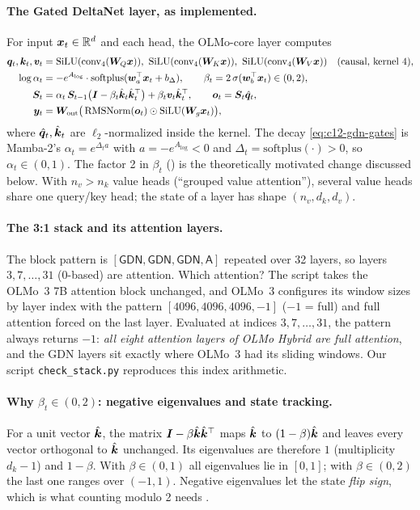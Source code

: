 \paragraph{The Gated DeltaNet layer, as implemented.} For input $\bm{x}_t\in\mathbb{R}^d$ and each head, the
OLMo-core layer computes
\begin{align}
  \vq_t,\vk_t,\vv_t &= \SiLU(\mathrm{conv}_4(\mW_Q\vx)),\ \SiLU(\mathrm{conv}_4(\mW_K\vx)),\
     \SiLU(\mathrm{conv}_4(\mW_V\vx)) \quad\text{(causal, kernel 4)},\label{eq:c12-gdn-qkv}\\
  \log\alpha_t &= -e^{A_{\log}}\cdot\mathrm{softplus}(\vw_a\T\vx_t + b_{\Delta}),\qquad
  \beta_t = 2\,\sigmoid(\vw_b\T\vx_t)\in(0,2),\label{eq:c12-gdn-gates}\\
  \mS_t &= \alpha_t\,\mS_{t-1}\big(\mI - \beta_t\hat\vk_t\hat\vk_t\T\big) + \beta_t\vv_t\hat\vk_t\T,
     \qquad \vo_t = \mS_t\hat\vq_t,\label{eq:c12-gdn}\\
  \vy_t &= \mW_{\mathrm{out}}\big(\RMSNorm(\vo_t)\had\SiLU(\mW_g\vx_t)\big),\label{eq:c12-gdn-out}
\end{align}
where $\hat{\bm{q}}_t,\hat{\bm{k}}_t$ are $\ell_2$-normalized inside the kernel. The decay
\eqref{eq:c12-gdn-gates} is Mamba-2's $\alpha_t = e^{\Delta_ta}$ with $a = -e^{A_{\log}}<0$ and
$\Delta_t = \mathrm{softplus}(\cdot)>0$, so $\alpha_t\in(0,1)$. The factor 2 in $\beta_t$
(\code{allow_neg_eigval=True}) is the theoretically motivated change discussed below. With
$n_v>n_k$ value heads (``grouped value attention''), several value heads share one query/key
head; the state of a layer has shape $(n_v, d_k, d_v)$.

\paragraph{The 3:1 stack and its attention layers.} The block pattern is
$[\mathsf{GDN},\mathsf{GDN},\mathsf{GDN},\mathsf{A}]$ repeated over 32 layers, so layers
$3,7,\dots,31$ (0-based) are attention. Which attention? The script takes the OLMo~3 7B attention
block unchanged, and OLMo~3 configures its window sizes by layer index with the pattern
$[4096,4096,4096,-1]$ ($-1$ = full) and full attention forced on the last layer. Evaluated at
indices $3,7,\dots,31$, the pattern always returns $-1$: \emph{all eight attention layers of OLMo
Hybrid are full attention}, and the GDN layers sit exactly where OLMo~3 had its sliding windows.
Our script \texttt{check\_stack.py} reproduces this index arithmetic.

\paragraph{Why $\beta_t\in(0,2)$: negative eigenvalues and state tracking.} For a unit vector
$\hat{\bm{k}}$, the matrix $\bm{I}-\beta\hat{\bm{k}}\hat{\bm{k}}^{\top}$ maps $\hat{\bm{k}}$ to $(1-\beta)\hat{\bm{k}}$ and leaves
every vector orthogonal to $\hat{\bm{k}}$ unchanged. Its eigenvalues are therefore $1$ (multiplicity
$d_k-1$) and $1-\beta$. With $\beta\in(0,1)$ all eigenvalues lie in $[0,1]$; with $\beta\in(0,2)$
the last one ranges over $(-1,1)$. Negative eigenvalues let the state \emph{flip sign}, which is
what counting modulo 2 needs \citep{c03-grazzi2025unlocking}.


